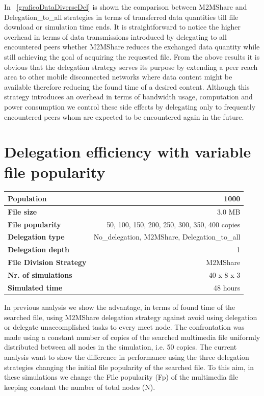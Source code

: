 In \figurename~\ref{graficoDataDiverseDel} is shown the comparison between M2MShare and Delegation\_to\_all strategies in terms of transferred data quantities till file download or simulation time ends. It is straightforward to notice the higher overhead in terms of data transmissions introduced by delegating to all encountered peers whether M2MShare reduces the exchanged data quantity while still achieving the goal of acquiring the requested file. From the above results it is obvious that the delegation strategy serves its purpose by extending a peer reach area to other mobile disconnected networks where data content might be available therefore reducing the found time of a desired content.
Although this strategy introduces an overhead in terms of bandwidth usage, computation and power consumption we control these side effects by delegating only to frequently encountered peers whom are expected to be encountered again in the future.



\newpage 
\section{Delegation efficiency with variable file popularity}
\begin{table}[h]
\begin{center}
\begin{tabular}{|l|r|}
\hline
\bfseries Population & 1000 \\
\hline
\bfseries File size & 3.0 MB \\
\hline
\bfseries File popularity & 50, 100, 150, 200, 250, 300, 350, 400 copies \\
\hline
\bfseries Delegation type & No\_delegation, M2MShare, Delegation\_to\_all \\
\hline
\bfseries Delegation depth & 1 \\
\hline
\bfseries File Division Strategy & M2MShare \\
\hline
\bfseries Nr. of simulations & 40 x 8 x 3\\
\hline
\bfseries Simulated time & 48 hours \\
\hline
\end{tabular}
\end{center}
\end{table}
In previous analysis we show the advantage, in terms of found time of the searched file, using M2MShare delegation strategy against avoid using delegation or delegate unaccomplished tasks to every meet node. The confrontation was made using a constant number of copies of the searched multimedia file uniformly distributed between all nodes in the simulation, i.e. 50 copies. The current analysis want to show the difference in performance using the three delegation strategies changing the initial file popularity of the searched file. To this aim, in these simulations we change the File popularity (Fp) of the multimedia file keeping constant the number of total nodes (N).

